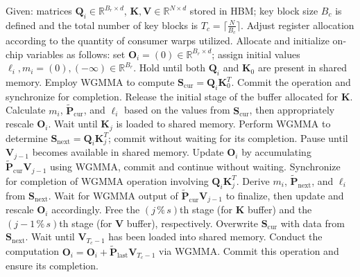 \begin{enumerate}
\begin{algorithm}[H]
    \caption{\small\label{alg:flash3_wgmma}\textsc{FlashAttention-3} consumer warpgroup forward pass}
    \begin{algorithmic}[1]
      \REQUIRE  Given: matrices $\mathbf{Q}_i \in \mathbb{R}^{B_r \times d}$, $\mathbf{K}, \mathbf{V} \in \mathbb{R}^{N \times d}$ stored in HBM; key block size $B_c$ is defined and the total number of key blocks is $T_c = \lceil \frac{N}{B_c} \rceil$.
      \STATE Adjust register allocation according to the quantity of consumer warps utilized.
      \STATE Allocate and initialize on-chip variables as follows: set $\mathbf{O}_i = (0) \in \mathbb{R}^{B_r \times d}$; assign initial values $\ell_i, m_i = (0), (-\infty) \in \mathbb{R}^{B_r}$.
      \STATE Hold until both $\mathbf{Q}_i$ and $\mathbf{K}_0$ are present in shared memory.
      \STATE Employ WGMMA to compute $\mathbf{S}_{\mathrm{cur}} = \mathbf{Q}_i \mathbf{K}_0^T$. Commit the operation and synchronize for completion.
      \STATE Release the initial stage of the buffer allocated for $\mathbf{K}$.
      \STATE Calculate $m_{i}$, $\tilde{\mathbf{P}}_{\mathrm{cur}}$, and $\ell_{i}$ based on the values from $\mathbf{S}_{\mathrm{cur}}$, then appropriately rescale $\mathbf{O}_i$.
        \STATE Wait until $\mathbf{K}_j$ is loaded to shared memory.
        \label{code:mainloop_start}
        \STATE Perform WGMMA to determine $\mathbf{S}_{\mathrm{next}} = \mathbf{Q}_i \mathbf{K}_{j}^T$; commit without waiting for its completion. \label{code:first_wgmma}
        \STATE Pause until $\mathbf{V}_{j-1}$ becomes available in shared memory.
        \STATE Update $\mathbf{O}_{i}$ by accumulating $\tilde{\mathbf{P}}_{\mathrm{cur}} \mathbf{V}_{j-1}$ using WGMMA, commit and continue without waiting. \label{code:second_wgmma}
        \STATE Synchronize for completion of WGMMA operation involving $\mathbf{Q}_i \mathbf{K}_{j}^T$.
        \STATE Derive $m_{i}$, $\tilde{\mathbf{P}}_{\mathrm{next}}$, and $\ell_{i}$ from $\mathbf{S}_{\mathrm{next}}$. \label{code:softmax}
        \STATE Wait for WGMMA output of $\tilde{\mathbf{P}}_{\mathrm{cur}} \mathbf{V}_{j-1}$ to finalize, then update and rescale $\mathbf{O}_i$ accordingly.
        \STATE Free the $(j\,\%\,s)$th stage (for $\mathbf{K}$ buffer) and the $(j-1\,\%\,s)$th stage (for $\mathbf{V}$ buffer), respectively.
        \STATE Overwrite $\mathbf{S}_{\mathrm{cur}}$ with data from $\mathbf{S}_{\mathrm{next}}$.
        \label{code:mainloop_end}
      \ENDFOR \STATE Wait until $\mathbf{V}_{T_c - 1}$ has been loaded into shared memory.
      \STATE Conduct the computation $\mathbf{O}_{i} = \mathbf{O}_{i} + \tilde{\mathbf{P}}_{\mathrm{last}} \mathbf{V}_{T_c - 1}$ via WGMMA. Commit this operation and ensure its completion.


\end{algorithmic}
\end{algorithm}
\end{enumerate}
